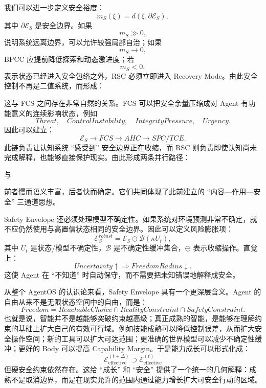 我们可以进一步定义安全裕度：
\[
m_S(\xi)
=
d(
\xi,
\partial\mathcal E_S
),
\]
其中 $\partial\mathcal E_S$ 是安全边界。如果
\[
m_S\gg0,
\]
说明系统远离边界，可以允许较强局部自治；如果
\[
m_S\rightarrow0,
\]
BPCC 应提前降低探索和动态激进度；若
\[
m_S<0,
\]
表示状态已经进入安全包络之外，RSC 必须立即进入 Recovery Mode。由此安全控制不再是二值系统，而形成：
\begin{statementbox}
\centering
{}
\end{statementbox}

这与 FCS 之间存在非常自然的关系。FCS 可以把安全余量压缩成对 Agent 有功能意义的连续影响状态，例如
\[
Threat,
\quad
ControlInstability,
\quad
IntegrityPressure,
\quad
Urgency.
\]
因此可以建立：
\[
\mathcal E_S
\rightarrow
FCS
\rightarrow
AHC
\rightarrow
SPC/TCE.
\]
此链负责让认知系统 ``感受到'' 安全边界正在收缩，而 RSC 则负责即使认知尚未完成解释，也能够直接保护现实。由此形成两条并行路径：
\begin{statementbox}
\centering
{}
\end{statementbox}
与
\begin{statementbox}
\centering
{}
\end{statementbox}
前者慢而语义丰富，后者快而确定。它们共同体现了此前建立的 ``内容—作用—安全'' 三通道思想。

Safety Envelope 还必须处理模型不确定性。如果系统对环境预测非常不确定，就不应仍然使用与高置信状态相同的安全边界。因此可以定义风险膨胀项：
\[
\mathcal E_S^{robust}
=
\mathcal E_S
\ominus
\mathcal B(
\kappa U_t
),
\]
其中 $U_t$ 是状态/模型不确定性，$\mathcal B$ 是不确定性缓冲集合，$\ominus$ 表示收缩操作。直觉上：
\[
Uncertainty\uparrow
\Rightarrow
FreedomRadius\downarrow.
\]
这使 Agent 在 ``不知道'' 时自动保守，而不需要把未知错误地解释成安全。

从整个 AgentOS 的认识论来看，Safety Envelope 具有一个更深层含义。Agent 的自由从来不是无限状态空间中的自由，而是：
\[
\boxed{
Freedom
=
ReachableChoice
\cap
RealityConstraint
\cap
SafetyConstraint.
}
\]
也就是说，智能并不是越能够突破约束越高级；真正成熟的智能，是能够在理解约束的基础上扩大自己的有效可行域。例如技能成熟可以降低控制误差，从而扩大安全操作空间；新的工具可以扩大可达范围；更准确的世界模型可以减少不确定性缓冲；更好的 Body 可以提高 Capability Margin。于是能力成长可以形式化成：
\[
\mathcal E_{\mathrm{effective}}^{(t+\Delta)}
\supset
\mathcal E_{\mathrm{effective}}^{(t)}
\]
但硬安全约束依然存在。这给 ``成长'' 和 ``安全'' 提供了一个统一的几何解释：成熟不是取消边界，而是在现实允许的范围内通过能力增长扩大可安全行动的区域。

